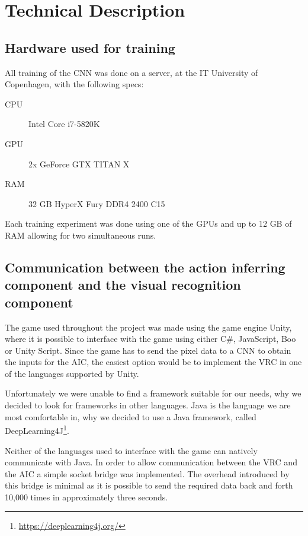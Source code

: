 
\section{Technical Description}

\subsection{Hardware used for training}
\label{sub:hardware}
All training of the CNN was done on a server, at the IT University of Copenhagen, with the following specs:

\begin{description}
	\item [CPU] Intel\textsuperscript{\textregistered} Core\textsuperscript{\texttrademark} i7-5820K
	\item [GPU] 2x GeForce\textsuperscript{\textregistered} GTX TITAN X
	\item [RAM] 32 GB HyperX Fury DDR4 2400 C15
\end{description}	

\noindent
Each training experiment was done using one of the GPUs and up to 12 GB of RAM allowing for two simultaneous runs.

\subsection{Communication between the action inferring component and the visual recognition component}
\label{sec:com-vrc-aic}
The game used throughout the project was made using the game engine Unity, where it is possible to interface with the game using either C\#, JavaScript, Boo or Unity Script. Since the game has to send the pixel data to a CNN to obtain the inputs for the AIC, the easiest option would be to implement the VRC in one of the languages supported by Unity.

Unfortunately we were unable to find a framework suitable for our needs, why we decided to look for frameworks in other languages. Java is the language we are most comfortable in, why we decided to use a Java framework, called DeepLearning4J\footnote{\url{https://deeplearning4j.org/}}.

Neither of the languages used to interface with the game can natively communicate with Java. In order to allow communication between the VRC and the AIC a simple socket bridge was implemented. The overhead introduced by this bridge is minimal as it is possible to send the required data back and forth 10,000 times in approximately three seconds.

